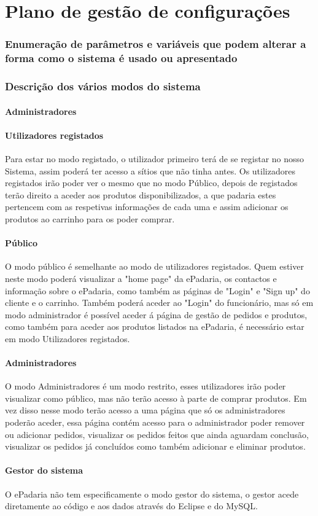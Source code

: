 \chapter{Plano de gestão de configurações}
\label{plano_de_gestao_de_configuracoes}

\subsection{Enumeração de parâmetros e variáveis que podem alterar a forma como o sistema é usado ou apresentado}

\subsection{Descrição dos vários modos do sistema}
\subsubsection{Administradores}
\subsubsection{Utilizadores registados}
Para estar no modo registado, o utilizador primeiro terá de se registar no nosso Sistema, assim poderá ter acesso a sítios que não tinha antes. Os utilizadores registados irão poder ver o mesmo que no modo Público, depois de registados terão direito a aceder aos produtos disponibilizados, a que padaria estes pertencem com as respetivas informações de cada uma e assim adicionar os produtos ao carrinho para os poder comprar.
\subsubsection{Público}
O modo público é semelhante ao modo de utilizadores registados. Quem estiver neste modo poderá visualizar a "home page" da ePadaria, os contactos e informação sobre o ePadaria, como também as páginas de "Login" e "Sign up" do cliente e o carrinho. Também poderá aceder ao "Login" do funcionário, mas só em modo administrador é possível aceder á página de gestão de pedidos e produtos, como também para aceder aos produtos listados na ePadaria, é necessário estar em modo Utilizadores registados.
\subsubsection{Administradores}
O modo Administradores é um modo restrito, esses utilizadores irão poder visualizar como público, mas não terão acesso à parte de comprar produtos. Em vez disso nesse modo terão acesso a uma página que só os administradores poderão aceder, essa página contém acesso para o administrador poder remover ou adicionar pedidos, visualizar os pedidos feitos que ainda aguardam conclusão, visualizar os pedidos já concluídos como também adicionar e eliminar produtos.
\subsubsection{Gestor do sistema}
O ePadaria não tem especificamente o modo gestor do sistema, o gestor acede diretamente ao código e aos dados através do Eclipse e do MySQL.